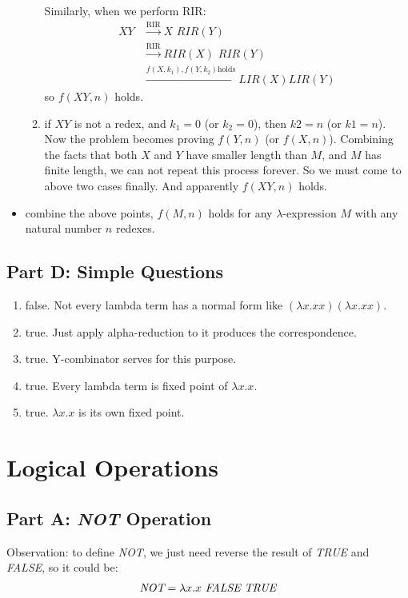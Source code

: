 \documentclass[paper=a4, fontsize=11pt]{scrartcl} %
\numberwithin{equation}{section} %
\numberwithin{figure}{section} %
\numberwithin{table}{section} %
\begin{document}
\begin{itemize}
\begin{enumerate}
	Similarly, when we perform RIR:
	\begin{align*}
	  XY & \xrightarrow{\text{RIR}} X\,\,RIR(Y)\\
	     & \xrightarrow{\text{RIR}} RIR(X)\,\,RIR(Y)\\
	     & \xrightarrow{f(X,k_1), f(Y,k_2) \text{holds}} LIR(X) LIR(Y)
	\end{align*}
	so $f(XY,n)$ holds.
      \item if $XY$ is not a redex, and $k_1 = 0$ (or $k_2 = 0$), then $k2 = n$ (or $k1 = n$). Now the problem becomes proving $f(Y,n)$ (or $f(X,n)$). Combining the facts that both $X$ and $Y$ have smaller length than $M$, and $M$ has finite length, we can not repeat this process forever. So we must come to above two cases finally. And apparently $f(XY,n)$ holds.
    \end{enumerate}
  \item combine the above points, $f(M,n)$ holds for any $\lambda$-expression $M$ with any natural number $n$ redexes.
\end{itemize}

\subsection{Part D: Simple Questions}
\begin{enumerate}
  \item false. Not every lambda term has a normal form like $(\lambda x.xx)(\lambda x.xx)$.
  \item true. Just apply alpha-reduction to it produces the correspondence.
  \item true. Y-combinator serves for this purpose.
  \item true. Every lambda term is fixed point of $\lambda x.x$.
  \item true. $\lambda x.x$ is its own fixed point.
\end{enumerate}


\section{Logical Operations}
\subsection{Part A: \textit{NOT} Operation}
Observation: to define \textit{NOT}, we just need reverse the result of \textit{TRUE} and \textit{FALSE}, so it could be:
\begin{align}
  \textit{NOT}=\lambda x. x\,\,\textit{FALSE\,\,TRUE} \label{eq:NOT}
\end{align}
\end{document}
